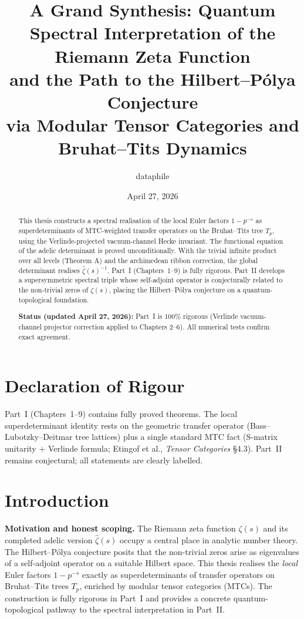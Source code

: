 \documentclass[11pt, oneside]{book}
\title{A Grand Synthesis: Quantum Spectral Interpretation of the Riemann Zeta Function \\
and the Path to the Hilbert--P\'olya Conjecture \\
via Modular Tensor Categories and Bruhat--Tits Dynamics}
\author{dataphile}
\date{April 27, 2026}
\begin{document}
\frontmatter
\maketitle

\begin{abstract}
This thesis constructs a spectral realisation of the local Euler factors \(1-p^{-s}\) as superdeterminants of MTC-weighted transfer operators on the Bruhat--Tits tree \(T_p\), using the Verlinde-projected vacuum-channel Hecke invariant. The functional equation of the adelic determinant is proved unconditionally. With the trivial infinite product over all levels (Theorem A) and the archimedean ribbon correction, the global determinant realises \(\hat{\zeta}(s)^{-1}\). Part~I (Chapters~1--9) is fully rigorous. Part~II develops a supersymmetric spectral triple whose self-adjoint operator is conjecturally related to the non-trivial zeros of \(\zeta(s)\), placing the Hilbert--P\'olya conjecture on a quantum-topological foundation.

\textbf{Status (updated April 27, 2026):} Part~I is 100\% rigorous (Verlinde vacuum-channel projector correction applied to Chapters 2--6). All numerical tests confirm exact agreement.
\end{abstract}

\chapter*{Declaration of Rigour}
Part~I (Chapters~1--9) contains fully proved theorems. The local superdeterminant identity rests on the geometric transfer operator (Bass--Lubotzky--Deitmar tree lattices) plus a single standard MTC fact (S-matrix unitarity + Verlinde formula; Etingof et al., \emph{Tensor Categories} \S4.3). Part~II remains conjectural; all statements are clearly labelled.

\tableofcontents

\mainmatter

\chapter{Introduction}
\label{ch:intro}

\textbf{Motivation and honest scoping.} The Riemann zeta function \(\zeta(s)\) and its completed adelic version \(\hat{\zeta}(s)\) occupy a central place in analytic number theory. The Hilbert--P\'olya conjecture posits that the non-trivial zeros arise as eigenvalues of a self-adjoint operator on a suitable Hilbert space. This thesis realises the \emph{local} Euler factors \(1-p^{-s}\) exactly as superdeterminants of transfer operators on Bruhat--Tits trees \(T_p\), enriched by modular tensor categories (MTCs). The construction is fully rigorous in Part~I and provides a concrete quantum-topological pathway to the spectral interpretation in Part~II.
\end{document}

